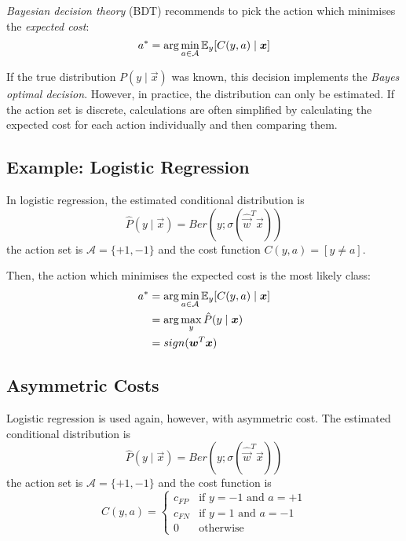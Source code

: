 \emph{Bayesian decision theory} (BDT)
recommends to
pick the action which minimises the
\emph{expected cost}:
\begin{equation*}
a^* =
\arg\min_{a \in \mathcal{A}}{
	\mathbb{E}_y[C(y, a) \mid \boldsymbol{x}]
}
\end{equation*}

If the true distribution $P(y \mid \vec{x})$
was known, this decision implements the
\emph{Bayes optimal decision}.
However, in practice, the distribution
can only be estimated.
If the action set is discrete,
calculations are often simplified
by calculating the expected cost
for each action individually
and then comparing them.


\subsection{Example: Logistic Regression}
In logistic regression,
the estimated conditional distribution is
\begin{equation*}
\hat{P}(y \mid \vec{x}) =
Ber(y ; \sigma(\hat{\vec{w}}^T \vec{x}))
\end{equation*}
the action set is
$\mathcal{A} = \{+1, -1\}$ and
the cost function
$C(y, a) = [y \neq a]$.

Then, the action which minimises the
expected cost is the most likely class:
\begin{align*}
a^* &=
\arg\min_{a \in \mathcal{A}}{
	\mathbb{E}_y[C(y, a) \mid \boldsymbol{x}]
} \\
&= \arg\max_y{\hat{P}(y \mid \boldsymbol{x})} \\
&= sign(\boldsymbol{w}^T \boldsymbol{x})
\end{align*}


\subsection{Asymmetric Costs}
Logistic regression is used again,
however, with asymmetric cost.
The estimated conditional distribution is
\begin{equation*}
\hat{P}(y \mid \vec{x}) =
Ber(y ; \sigma(\hat{\vec{w}}^T \vec{x}))
\end{equation*}
the action set is
$\mathcal{A} = \{+1, -1\}$ and
the cost function is
\begin{equation*}
C(y, a) =
\begin{cases}
c_{FP} & \text{if $y = -1$ and $a = +1$} \\
c_{FN} & \text{if $y = 1$ and $a = -1$} \\
0 & \text{otherwise}
\end{cases}
\end{equation*}

